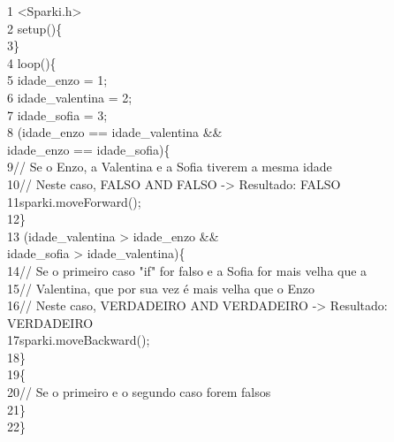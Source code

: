 \documentclass[conference]{IEEEtran}
\begin{document}
{\selectfont 
    {\color{cinza}1} <Sparki.h>\\
    {\color{cinza}2} setup()\{\\
    {\color{cinza}3}\quad\}\\
    {\color{cinza}4} loop()\{\\
    {\color{cinza}5}\quad{} idade\_enzo = 1;\\
    {\color{cinza}6}\quad{} idade\_valentina = 2;\\
    {\color{cinza}7}\quad{} idade\_sofia = 3;\\
    {\color{cinza}8}\quad{} (idade\_enzo == idade\_valentina {\color{verde}\&\&\\} idade\_enzo == idade\_sofia)\{\\
    {\color{cinza}9}\quad\quad\quad // Se o Enzo, a Valentina e a Sofia tiverem a mesma idade\\
    {\color{cinza}10}\quad\quad\quad // Neste caso, FALSO AND FALSO -\textgreater{} Resultado: FALSO\\
    {\color{cinza}11}\quad\quad\quad sparki.moveForward();\\
    {\color{cinza}12}\quad\quad\}\\
    {\color{cinza}13}\quad{} (idade\_valentina > idade\_enzo {\color{verde}\&\&\\} idade\_sofia > idade\_valentina)\{\\
    {\color{cinza}14}\quad\quad\quad // Se o primeiro caso "if" for falso e a Sofia for mais velha que a\\
    {\color{cinza}15}\quad\quad\quad // Valentina, que por sua vez é mais velha que o Enzo\\
    {\color{cinza}16}\quad\quad\quad // Neste caso, VERDADEIRO AND VERDADEIRO -\textgreater{} Resultado: VERDADEIRO\\
    {\color{cinza}17}\quad\quad\quad sparki.moveBackward();\\
    {\color{cinza}18}\quad\quad\}\\
    {\color{cinza}19}\quad{}\{\\
    {\color{cinza}20}\quad\quad\quad // Se o primeiro e o segundo caso forem falsos\\
    {\color{cinza}21}\quad\quad\}\\
    {\color{cinza}22}\quad\}}
\\
\end{document}
